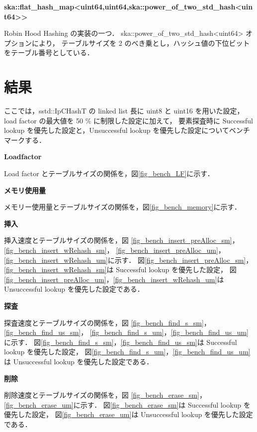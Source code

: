 %
{\bf ska::flat\_hash\_map<uint64,uint64,ska::power\_of\_two\_std\_hash<uint64>>}

Robin Hood Hashing の実装の一つ．
ska::power\_of\_two\_std\_hash<uint64> オプションにより，
テーブルサイズを 2 のべき乗とし，ハッシュ値の下位ビットをテーブル番号としている．

\leavevmode \newline


\section{結果}
ここでは，sstd::IpCHashT の linked list 長に uint8 と uint16 を用いた設定，load factor の最大値を 50 \% に制限した設定に加えて，
要素探査時に Successful lookup を優先した設定と，Unsuccessful lookup を優先した設定についてベンチマークする．
\leavevmode \newline

%
{\bf Loadfactor}

Load factor とテーブルサイズの関係を，図\ref{fig_bench_LF}に示す．
\leavevmode \newline

%
{\bf メモリ使用量}

メモリー使用量とテーブルサイズの関係を，図\ref{fig_bench_memory}に示す．
\leavevmode \newline

%
{\bf 挿入}

挿入速度とテーブルサイズの関係を，図
\ref{fig_bench_insert_preAlloc_sm}，\ref{fig_bench_insert_wRehash_sm}，
\ref{fig_bench_insert_preAlloc_um}，\ref{fig_bench_insert_wRehash_um}に示す．
図\ref{fig_bench_insert_preAlloc_sm}，\ref{fig_bench_insert_wRehash_sm}は Successful lookup を優先した設定，
図\ref{fig_bench_insert_preAlloc_um}，\ref{fig_bench_insert_wRehash_um}は Unsuccessful lookup を優先した設定である．
\leavevmode \newline

%
{\bf 探査}

探査速度とテーブルサイズの関係を，図
\ref{fig_bench_find_s_sm}，\ref{fig_bench_find_us_sm}，
\ref{fig_bench_find_s_um}，\ref{fig_bench_find_us_um}に示す．
図\ref{fig_bench_find_s_sm}，\ref{fig_bench_find_us_sm}は Successful lookup を優先した設定，
図\ref{fig_bench_find_s_um}，\ref{fig_bench_find_us_um}は Unsuccessful lookup を優先した設定である．
\leavevmode \newline

%
{\bf 削除}

削除速度とテーブルサイズの関係を，図
\ref{fig_bench_erase_sm}，
\ref{fig_bench_erase_um}に示す．
図\ref{fig_bench_erase_sm}は Successful lookup を優先した設定，
図\ref{fig_bench_erase_um}は Unsuccessful lookup を優先した設定である．
\leavevmode \newline

